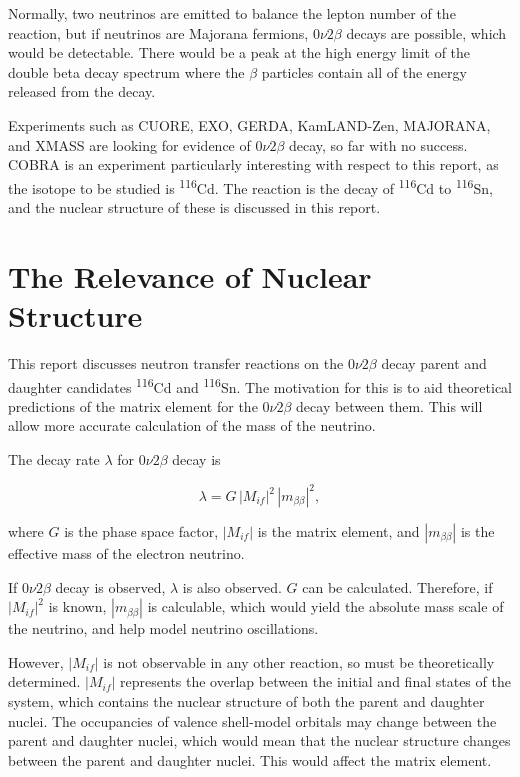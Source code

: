 Normally, two neutrinos are emitted to balance the lepton number of the reaction, but if neutrinos are Majorana fermions, $0\nu2\beta$ decays are possible, which would be detectable. There would be a peak at the high energy limit of the double beta decay spectrum where the $\beta$ particles contain all of the energy released from the decay.

Experiments such as CUORE\cite{cuore}, EXO\cite{exo}, GERDA\cite{gerda}, KamLAND-Zen\cite{kamlandzen}, MAJORANA\cite{majoranaexpt}, and XMASS\cite{xmass} are looking for evidence of $0\nu2\beta$ decay, so far with no success. COBRA\cite{cobra} is an experiment particularly interesting with respect to this report, as the isotope to be studied is \textsuperscript{116}Cd. The reaction is the decay of \textsuperscript{116}Cd to \textsuperscript{116}Sn, and the nuclear structure of these is discussed in this report.

\section{The Relevance of Nuclear Structure}

This report discusses neutron transfer reactions on the $0\nu2\beta$ decay parent and daughter candidates \textsuperscript{116}Cd and \textsuperscript{116}Sn. The motivation for this is to aid theoretical predictions of the matrix element for the $0\nu2\beta$ decay between them. This will allow more accurate calculation of the mass of the neutrino.

The decay rate $\lambda$ for $0\nu2\beta$ decay is 

\begin{equation}
\lambda = G \, |M_{if}|^2 \, |m_{\beta\beta}|^2\mathrm{,}
\end{equation}

where $G$ is the phase space factor, $|M_{if}|$ is the matrix element, and $|m_{\beta\beta}|$ is the effective mass of the electron neutrino\cite{mbetabeta}.

If $0\nu2\beta$ decay is observed, $\lambda$ is also observed. $G$ can be calculated\cite{phasespace}. Therefore, if $|M_{if}|^2$ is known, $|m_{\beta\beta}|$ is calculable, which would yield the absolute mass scale of the neutrino, and help model neutrino oscillations\cite{mbetabeta}.

However, $|M_{if}|$ is not observable in any other reaction, so must be theoretically determined. $|M_{if}|$ represents the overlap between the initial and final states of the system, which contains the nuclear structure of both the parent and daughter nuclei. The occupancies of valence shell-model orbitals may change between the parent and daughter nuclei, which would mean that the nuclear structure changes between the parent and daughter nuclei. This would affect the matrix element.

